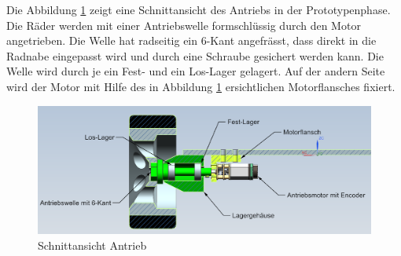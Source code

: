 Die Abbildung \ref{fig:sectionview-wheelmount} zeigt eine Schnittansicht des Antriebs in der Prototypenphase. Die Räder werden mit einer Antriebswelle formschlüssig durch den Motor angetrieben. Die Welle hat radseitig ein 6-Kant angefrässt, dass direkt in die Radnabe eingepasst wird und durch eine Schraube gesichert werden kann. Die Welle wird durch je ein Fest- und ein Los-Lager gelagert. Auf der andern Seite wird der Motor mit Hilfe des in Abbildung \ref{fig:sectionview-wheelmount} ersichtlichen Motorflansches fixiert. 

\begin{figure}[H]
\centering
\includegraphics[width=1.0\textwidth]{img/Antrieb.png}
\caption{Schnittansicht Antrieb}
\label{fig:sectionview-wheelmount}
\end{figure}



